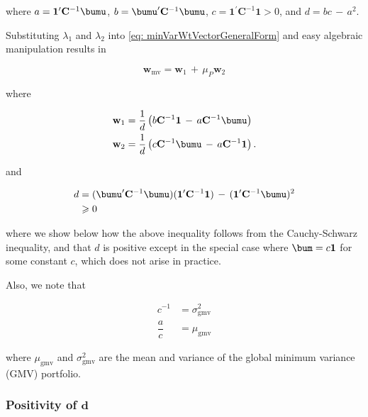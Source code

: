 \documentclass[graybox,envcountchap,sectrefs]{svmono}\usepackage[]{graphicx}\usepackage[]{xcolor}
\begin{document}
\begin{appendices}
where $a=\mathbf{1}^{\prime}\mathbf{C}^{-1}\bumu$, $b=\bumu^{\prime}\mathbf{C}^{-1}\bumu$,
$c=\mathbf{1}^{\prime}\mathbf{C}^{-1}\mathbf{1}>0$, and $d=bc\,-\,a^{2}$.

Substituting $\lambda_{1}$ and $\lambda_{2}$ into \eqref{eq: minVarWtVectorGeneralForm}
and easy algebraic manipulation results in

\begin{equation}
\mathbf{w}_{\mathrm{mv}}=\mathbf{w}_{1}\,+\,\mu_{P}\mathbf{w}_{2}\label{eq: minVarWtVector}
\end{equation}

where

\begin{equation}
\begin{alignedat}{1}\mathbf{w}_{1} & =\dfrac{1}{d}\left(b\mathbf{C}^{-1}\mathbf{1}\,-\,a\mathbf{C}^{-1}\bumu\right)\\
\mathbf{w}_{2} & =\dfrac{1}{d}\left(c\mathbf{C}^{-1}\bumu\,-\,a\mathbf{C}^{-1}\mathbf{1}\right).
\end{alignedat}
\label{eq: minVarPairOfWts}
\end{equation}

and

\begin{align}
d & =(\bumu^{\mathrm{\prime}}\mathbf{C}^{-1}\bumu)({\bf 1^{\mathrm{\prime}}}\mathbf{C}^{-1}{\bf 1})\,-\,{\bf ({\bf 1^{\mathrm{\prime}}}}\mathbf{C}^{-1}\bumu)^{2}\label{eq: dExpression}\\
 & \geqslant0
\end{align}

where we show below how the above inequality follows from the Cauchy-Schwarz
inequality, and that $d$ is positive except in the special case where
$\bum=c\mathbf{1}$ for some constant $c$, which does not arise in
practice. 

Also, we note that

\begin{equation}
\begin{alignedat}{1}c^{-1} & =\sigma_{\mathrm{gmv}}^{2}\\
\dfrac{a}{c} & =\mu_{\mathrm{gmv}}
\end{alignedat}
\label{eq: constantsMore}
\end{equation}

where $\mu_{\mathrm{gmv}}$ and $\sigma_{\mathrm{gmv}}^{2}$ are the
mean and variance of the global minimum variance (GMV) portfolio.

\subsubsection*{Positivity of $\boldsymbol{d}$\label{subsec: positivity of d}}


\end{appendices}
\end{document}
